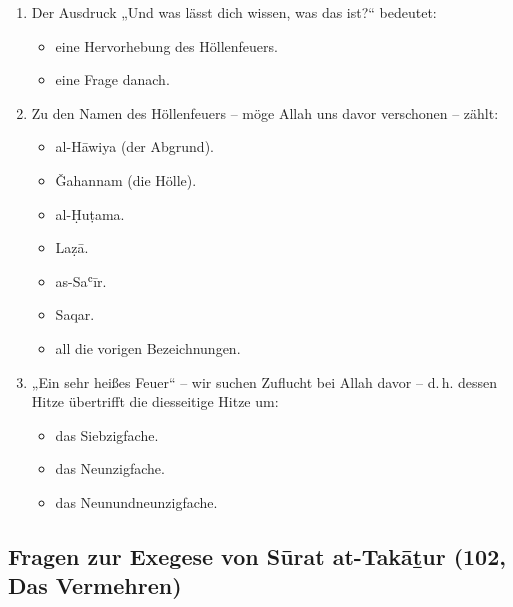 \begin{enumerate}[leftmargin=1.6em,resume]
\begin{itemize}
    \item Beide vorigen Bedeutungen.
  \end{itemize}
\item Der Ausdruck „Und was lässt dich wissen, was das ist?“ bedeutet:
  \begin{itemize}
    \item eine Hervorhebung des Höllenfeuers. \item eine Frage danach.
  \end{itemize}
\item Zu den Namen des Höllenfeuers -- möge Allah uns davor verschonen -- zählt:
  \begin{itemize}
    \item al-Hāwiya (der Abgrund). \item Ǧahannam (die Hölle).
    \item al-Ḥuṭama. \item Laẓā.
    \item as-Saʿīr. \item Saqar.
    \item all die vorigen Bezeichnungen.
  \end{itemize}
\item „Ein sehr heißes Feuer“ -- wir suchen Zuflucht bei Allah davor -- d.\,h. dessen Hitze
  übertrifft die diesseitige Hitze um:
  \begin{itemize}
    \item das Siebzigfache. \item das Neunzigfache. \item das Neunundneunzigfache.
  \end{itemize}
\end{enumerate}

\subsection*{Fragen zur Exegese von Sūrat at-Takāṯur (102, Das Vermehren)}

